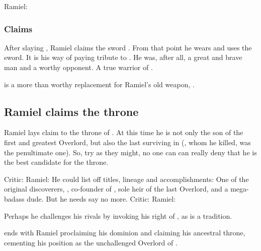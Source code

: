 \begin{garbage}
Ramiel:





\subsubsection{Claims \Scaleron}
After slaying \Dasteron, Ramiel claims the sword \Scaleron. 
From that point he wears and uses the sword. 
It is his way of paying tribute to \Dasteron. 
He was, after all, a great and brave man and a worthy opponent. 
A true warrior of \Mystraacht. 

\Scaleron{} is a more than worthy replacement for Ramiel's old weapon, \Ascaril. 









\subsection{Ramiel claims the throne}
Ramiel lays claim to the throne of \Mystraacht. 
At this time he is not only the son of the first and greatest Overlord, but also the last surviving \sathariah{} in \Mystraacht{} (\Shiaraid{}, whom he killed, was the penultimate one). 
So, try as they might, no one can can really deny that he is the best candidate for the throne. 

Critic: 
Ramiel:  
He could list off titles, lineage and accomplishments: One of the original discoverers, \sathariah, co-founder of \Mystraacht, sole heir of the last Overlord, and a mega-badass dude. 
But he needs say no more. 
Critic:  
Ramiel:  

Perhaps he challenges his rivals by invoking his right of , as is a \Mystraacht{} tradition.

\emph{\RamielsAwakeningBook} ends with Ramiel proclaiming his dominion and claiming his ancestral throne, cementing his position as the unchallenged Overlord of \Mystraacht. 


\end{garbage}
